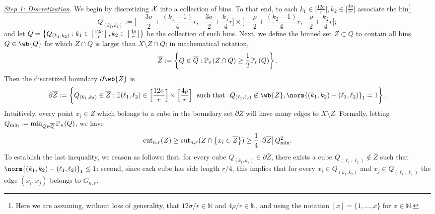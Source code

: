 	\emph{\underline{Step 1: Discretization}.}
	We begin by discretizing $\mathcal{X}$ into a collection of bins. To that end, to each $k_1 \in \bigl[\frac{12\sigma}{r}\bigr], k_2 \in \bigl[\frac{4\rho}{r}\bigr]$ associate the bin\footnote{Here we are assuming, without loss of generality, that $12\sigma/r \in \mathbb{N}$ and $4\rho/r \in \mathbb{N}$, and using the notation $[x] = \{1,\ldots,x\}$ for $x \in \mathbb{N}$.}
	\begin{equation*}
	Q_{(k_1,k_2)} := \biggl[-\frac{3\sigma}{2} + \frac{(k_1 - 1)}{4}r, -\frac{3\sigma}{2} + \frac{k_1}{4}r\biggr] \times \biggl[-\frac{\rho}{2} + \frac{(k_2 - 1)}{4}r, -\frac{\rho}{2} + \frac{k_2}{4}r\biggr];
	\end{equation*}
	and let $\overline{Q} = \left\{Q_{(k_1,k_2)}: k_1 \in \left[\frac{12\sigma}{r}\right], k_2 \in \bigl[\frac{4\rho}{r}\bigr]\right\}$ be the collection of such bins. Next, we define the binned set $\overline{Z} \subset \overline{Q}$ to contain all bins $Q \in \wb{Q}$ for which $Z \cap Q$ is larger than $X\setminus Z \cap Q$; in mathematical notation,
	\begin{equation*}
	\overline{Z} := \left\{Q \in \overline{Q}: \mathbb{P}_n(Z \cap Q) \geq \frac{1}{2}\mathbb{P}_n(Q)\right\}.
	\end{equation*}
	Then the discretized boundary $\partial \wb{Z}$ is 
	\begin{equation*}
	\partial \overline{Z} := \set{Q_{(k_1,k_2)} \in \overline{Z}: \exists (\ell_1,\ell_2) \in \Bigl[\frac{12\sigma}{r}\Bigr] \times \Bigl[\frac{4\rho}{r}\Bigr]~~\textrm{such that}~~Q_{(\ell_1,\ell_2)} \not\in \wb{Z}, \norm{(k_1,k_2) - (\ell_1,\ell_2)}_1 = 1}.
	\end{equation*}
	Intuitively, every point $x_i \in Z$ which belongs to a cube in the boundary set $\partial\overline{Z}$ will have many edges to $X\setminus Z$. Formally, letting $Q_{\min} := \min_{Q \in \overline{Q}} \mathbb{P}_n(Q)$, we have
	\begin{equation}
	\label{eqn:normalized_cut_lb_pf1}
	\mathrm{cut}_{n,r}(Z) \geq \mathrm{cut}_{n,r}(Z \cap \left\{x_i \in \overline{Z}\right\}) \geq \frac{1}{4} \left \lvert \partial \overline{Z} \right \rvert Q_{\min}^2.
	\end{equation}
	To establish the last inequality, we reason as follows: first, for every cube $Q_{(k_1,k_2)} \in \partial\overline{Z}$, there exists a cube $Q_{(\ell_1,\ell_2)} \not\in \overline{Z}$ such that $\norm{(k_1,k_2) - (\ell_1,\ell_2)}_1 \leq 1$; second, since each cube has side length $r/4$, this implies that for every $x_i \in Q_{(k_1,k_2)}$ and $x_j \in Q_{(\ell_1,\ell_2)}$ the edge $(x_i,x_j)$ belongs to $G_{n,r}$. 
	
